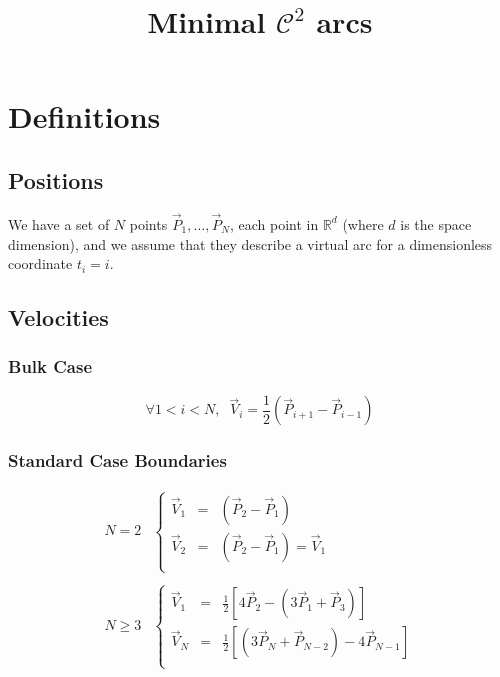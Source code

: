 \documentclass[aps,12pt]{revtex4}
\begin{document}
\title{Minimal $\mathcal{C}^2$ arcs}
\maketitle
	
\section{Definitions}

\subsection{Positions}
We have a set of $N$ points $\vec{P}_1,\ldots,\vec{P}_N$, each point in $\mathbb{R}^d$ (where $d$ is the space dimension), and we assume
that they describe a virtual arc for a dimensionless coordinate $t_i=i$.

\subsection{Velocities}

\subsubsection{Bulk Case}

\begin{equation}
	\forall 1<i<N,\;\;\vec{V}_i = \frac{1}{2}\left(\vec{P}_{i+1} - \vec{P}_{i-1}\right)
\end{equation}

\subsubsection{Standard Case Boundaries}
\begin{equation}
\begin{array}{rl}
N=2 &
	\left\lbrace
	\begin{array}{rcl}
	\vec{V}_1 & = &  \left( \vec{P}_2 - \vec{P}_1\right)\\
	\vec{V}_2 & = &  \left( \vec{P}_2 - \vec{P}_1\right) = \vec{V}_1\\
	\end{array}
	\right.
	\\
	\\
	N\geq3 & 
	\left\lbrace
	\begin{array}{rcl}
	\vec{V}_1 & = & \frac{1}{2} \left[ 4\vec{P}_2     - (3\vec{P}_1+\vec{P}_3)\right]\\
	\vec{V}_N & = & \frac{1}{2} \left[ (3\vec{P}_{N}+\vec{P}_{N-2})-4\vec{P}_{N-1} \right]\\
	\end{array}
	\right.
\end{array}
\end{equation}
\end{document}
